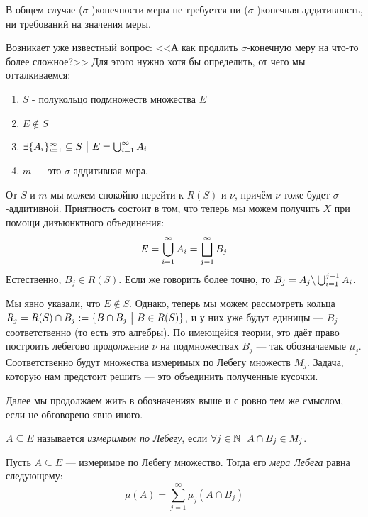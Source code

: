 \begin{note}
	В общем случае ($\sigma$-)конечности меры не требуется ни ($\sigma$-)конечная аддитивность, ни требований на значения меры.
\end{note}

\begin{note}
	Возникает уже известный вопрос: <<А как продлить $\sigma$-конечную меру на что-то более сложное?>> Для этого нужно хотя бы определить, от чего мы отталкиваемся:
	\begin{enumerate}
		\item $S$ - полукольцо подмножеств множества $E$
		
		\item $E \notin S$
		
		\item $\exists \{A_i\}_{i = 1}^\infty \subseteq S \ \big|\  E = \bigcup_{i = 1}^\infty A_i$
		
		\item $m$ --- это $\sigma$-аддитивная мера.
	\end{enumerate}
	От $S$ и $m$ мы можем спокойно перейти к $R(S)$ и $\nu$, причём $\nu$ тоже будет $\sigma$-аддитивной. Приятность состоит в том, что теперь мы можем получить $X$ при помощи дизъюнктного объединения:
	\[
		E = \bigcup_{i = 1}^\infty A_i = \bigsqcup_{j = 1}^\infty B_j
	\]
	Естественно, $B_j \in R(S)$. Если же говорить более точно, то $B_j = A_j \backslash \bigcup_{i = 1}^{j - 1} A_i$.
	
	Мы явно указали, что $E \notin S$. Однако, теперь мы можем рассмотреть кольца $R_j = R(S) \cap B_j := \{B \cap B_j \ \big|\  B \in R(S)\}$, и у них уже будут единицы --- $B_j$ соответственно (то есть это алгебры). По имеющейся теории, это даёт право построить лебегово продолжение $\nu$ на подмножествах $B_j$ --- так обозначаемые $\mu_j$. Соответственно будут множества измеримых по Лебегу множеств $M_j$. Задача, которую нам предстоит решить --- это объединить полученные кусочки.
\end{note}

\begin{note}
	Далее мы продолжаем жить в обозначениях выше и с ровно тем же смыслом, если не обговорено явно иного.
\end{note}

\begin{definition}
	$A \subseteq E$ называется \textit{измеримым по Лебегу}, если $\forall j \in \mathbb{N}\ \ A \cap B_j \in M_j$.
\end{definition}

\begin{definition}
	Пусть $A \subseteq E$ --- измеримое по Лебегу множество. Тогда его \textit{мера Лебега} равна следующему:
	\[
		\mu(A) = \sum_{j = 1}^\infty \mu_j(A \cap B_j)
	\]
\end{definition}

